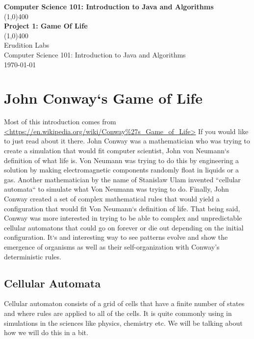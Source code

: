 \documentclass[11]{article}
\begin{document}
\begin{titlepage}
\begin{center}
\vspace{1cm}
\Large{\textbf{Computer Science 101: Introduction to Java and Algorithms}}\\
\vfill
\line(1,0){400}\\
\huge{\textbf{Project 1: Game Of Life}}\\
\line(1,0){400}\\
\vfill
Erudition Labs\\
Computer Science 101: Introduction to Java and Algorithms\\
\today\\
\end{center}
\end{titlepage}

\tableofcontents
\thispagestyle{empty}
\clearpage
\setcounter{page}{1}
\section{John Conway`s Game of Life}
Most of this introduction comes from \url{<https://en.wikipedia.org/wiki/Conway\%27s_Game_of_Life>} If you would like to just read about it there. John Conway was a mathematician who was trying to create a simulation that would fit computer scientist, John von Neumann`s definition of what life is. Von Neumann was trying to do this by engineering a solution by making electromagnetic components randomly float in liquids or a gas. Another mathematician by the name of Stanislaw Ulam invented ``cellular automata`` to simulate what Von Neumann was trying to do. Finally, John Conway created a set of complex mathematical rules that would yield a configuration that would fit Von Neumann`s definition of life. That being said, Conway was more interested in trying to be able to complex and unpredictable cellular automatons that could go on forever or die out depending on the initial configuration. It`s and interesting way to see patterns evolve and show the emergence of organisms as well as their self-organization with Conway's deterministic rules.

\subsection{Cellular Automata}
Cellular automaton consists of a grid of cells that have a finite number of states and where rules are applied to all of the cells. It is quite commonly using in simulations in the sciences like physics, chemistry etc. We will be talking about how we will do this in a bit.
\end{document}
